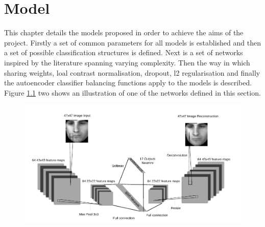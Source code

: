 \chapter{Model} \label{sec:model}

  This chapter details the models proposed in order to achieve the aims of the project.
  Firstly a set of common parameters for all models is established and then a set of possible
  classification structures is defined. Next is a set of networks inspired
  by the literature spanning varying complexity.
  Then the way in which sharing weights, loal contrast normalisation, dropout, l2 regularisation
  and finally the autoencoder classifier balancing functions apply to the models is described. Figure \ref{fig:netII}
  two shows an illustration of one of the networks defined in this section.

  \begin{figure}[h!]
   \centering
   \includegraphics[width=\textwidth]{illustrations/aec_network.pdf}
   \label{fig:netII}
  \end{figure}

